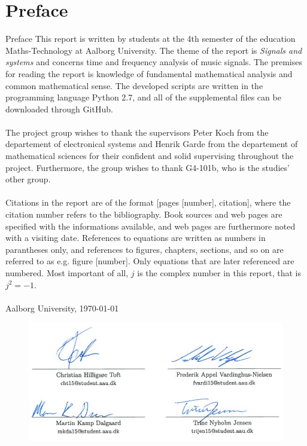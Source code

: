 \clearpage
\chapter*{Preface}
{Preface}
This report is written by students at the 4th semester of the education Maths-Technology at Aalborg University. The theme of the report is \textit{Signals and systems} and concerns time and frequency analysis of music signals. The premises for reading the report is knowledge of fundamental mathematical analysis and common mathematical sense. The developed scripts are written in the programming language Python 2.7, and all of the supplemental files can be downloaded through GitHub.
\\ \\
The project group wishes to thank the supervisors Peter Koch from the departement of electronical systems and Henrik Garde from the departement of mathematical sciences for their confident and solid supervising throughout the project. Furthermore, the group wishes to thank G4-101b, who is the studies' other group.
\\ \\
Citations in the report are of the format [pages [number], citation], where the citation number refers to the bibliography. Book sources and web pages are specified with the informations available, and web pages are furthermore noted with a visiting date. References to equations are written as numbers in parantheses only, and references to figures, chapters, sections, and so on are referred to as e.g. figure [number]. Only equations that are later referenced are numbered. Most important of all, $j$ is the complex number in this report, that is $j^2 = -1$.
\\ \\
\vspace{\baselineskip}\hfill Aalborg University, \today
\vfill\noindent

\begin{figure}[H]
\centering
\includegraphics[width = \textwidth]{figures/preface.jpg}
\end{figure}